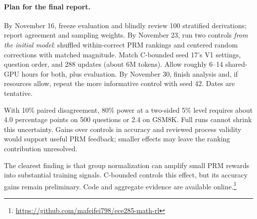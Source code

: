 \documentclass{article}
\begin{document}
\paragraph{Plan for the final report.}
By November 16, freeze evaluation and blindly review 100 stratified derivations; report agreement and sampling weights. By November 23, run two controls \emph{from the initial model}: shuffled within-correct PRM rankings and centered random corrections with matched magnitude. Match C-bounded seed 17's V1 settings, question order, and 288 updates (about 6M tokens). Allow roughly 6--14 shared-GPU hours for both, plus evaluation. By November 30, finish analysis and, if resources allow, repeat the more informative control with seed 42. Dates are tentative.

With 10\% paired disagreement, 80\% power at a two-sided 5\% level requires about 4.0 percentage points on 500 questions or 2.4 on GSM8K. Full runs cannot shrink this uncertainty. Gains over controls in accuracy and reviewed process validity would support useful PRM feedback; smaller effects may leave the ranking contribution unresolved.

The clearest finding is that group normalization can amplify small PRM rewards into substantial training signals. C-bounded controls this effect, but its accuracy gains remain preliminary. Code and aggregate evidence are available online.\footnote{\url{https://github.com/mafeifei798/ece285-math-rl}}
\end{document}
